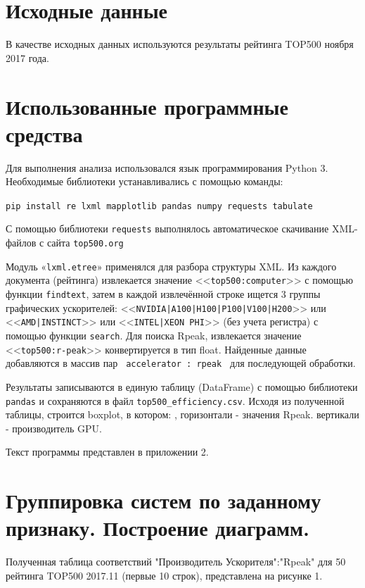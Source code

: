 \documentclass[14pt,a4paper]{extarticle}
\begin{document}
\section{Исходные данные}

В качестве исходных данных используются результаты
рейтинга TOP500 ноября 2017 года.

\section{Использованные программные средства}
Для выполнения анализа использовался язык программирования Python 3.
Необходимые библиотеки устанавливались с помощью команды:

\begin{sloppypar}
\texttt {pip install re lxml mapplotlib pandas numpy requests tabulate}
\end{sloppypar}

С помощью библиотеки \texttt{requests} выполнялось автоматическое скачивание XML-файлов с сайта \texttt{top500.org}

Модуль «\texttt{lxml.etree}» применялся для разбора структуры XML. Из каждого
документа (рейтинга) извлекается значение <<\texttt{top500:computer}>> с
помощью функции \texttt{findtext}, затем в каждой извлечённой строке ищется 3
группы графических ускорителей: <<\texttt{NVIDIA|A100|H100|P100|V100|H200}>>
или <<\texttt{AMD|INSTINCT}>> или <<\texttt{INTEL|XEON PHI}>> (без учета
регистра) с помощью функции \texttt{search}.
Для поиска Rpeak, извлекается значение <<\texttt{top500:r-peak}>> конвертируется в тип float.
Найденные данные добавляются в массив пар \texttt{ accelerator : rpeak } для последующей обработки.

Результаты записываются в единую таблицу (DataFrame) с помощью библиотеки
\texttt{pandas} и сохраняются в файл \texttt{top500\_efficiency.csv}.
Исходя из полученной таблицы, строится boxplot, в котором: ,
 горизонтали - значения Rpeak.
 вертикали - производитель GPU.

Текст программы представлен в приложении 2.

\newpage
\section{Группировка систем по заданному признаку. Построение диаграмм.}
    Полученная таблица соответствий "Производитель Ускорителя":"Rpeak"
    для 50 рейтинга TOP500 2017.11 (первые 10 строк), представлена на рисунке 1.
\end{document}

